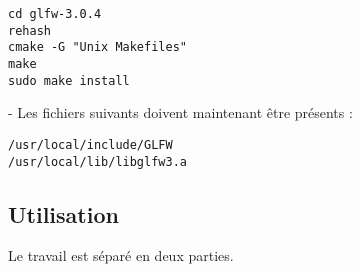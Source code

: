 \begin{verbatim}
cd glfw-3.0.4
rehash
cmake -G "Unix Makefiles"
make
sudo make install
\end{verbatim}

- Les fichiers suivants doivent maintenant être présents :

\begin{verbatim}
/usr/local/include/GLFW
/usr/local/lib/libglfw3.a
\end{verbatim}

\subsection{Utilisation}

Le travail est séparé en deux parties.